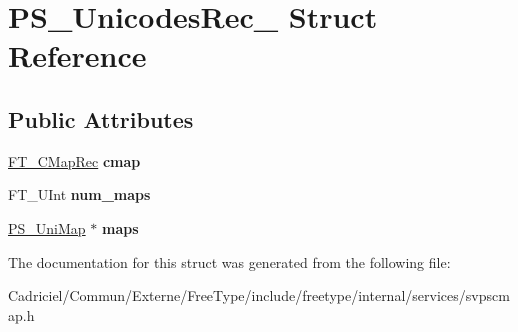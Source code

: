 \hypertarget{struct_p_s___unicodes_rec__}{}\section{P\+S\+\_\+\+Unicodes\+Rec\+\_\+ Struct Reference}
\label{struct_p_s___unicodes_rec__}
\subsection*{Public Attributes}
\begin{DoxyCompactItemize}
\item 
\hyperlink{struct_f_t___c_map_rec__}{F\+T\+\_\+\+C\+Map\+Rec} {\bfseries cmap}\hypertarget{struct_p_s___unicodes_rec___a4c3e28cb86c8a7039107437dcf995da7}{}\label{struct_p_s___unicodes_rec___a4c3e28cb86c8a7039107437dcf995da7}

\item 
F\+T\+\_\+\+U\+Int {\bfseries num\+\_\+maps}\hypertarget{struct_p_s___unicodes_rec___abbc3617f13363ddcf851ee229752b08d}{}\label{struct_p_s___unicodes_rec___abbc3617f13363ddcf851ee229752b08d}

\item 
\hyperlink{struct_p_s___uni_map__}{P\+S\+\_\+\+Uni\+Map} $\ast$ {\bfseries maps}\hypertarget{struct_p_s___unicodes_rec___abd0ff1abe19a2a6a838b631ec81d22cd}{}\label{struct_p_s___unicodes_rec___abd0ff1abe19a2a6a838b631ec81d22cd}

\end{DoxyCompactItemize}


The documentation for this struct was generated from the following file\+:\begin{DoxyCompactItemize}
\item 
Cadriciel/\+Commun/\+Externe/\+Free\+Type/include/freetype/internal/services/svpscmap.\+h\end{DoxyCompactItemize}
